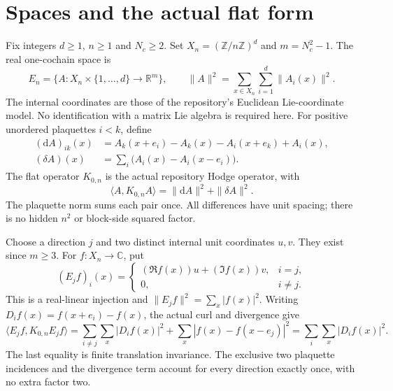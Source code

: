 \documentclass[11pt]{article}
\newcommand{\R}{\mathbb R}
\newcommand{\C}{\mathbb C}
\newcommand{\ip}[2]{\langle #1,#2\rangle}
\begin{document}
\section{Spaces and the actual flat form}
Fix integers $d\geq1$, $n\geq1$ and $N_c\geq2$. Set
$X_n=(\mathbb Z/n\mathbb Z)^d$ and $m=N_c^2-1$. The real one-cochain space is
\[
 E_n=\{A:X_n\times\{1,\ldots,d\}\longrightarrow\R^m\},\qquad
 \|A\|^2=\sum_{x\in X_n}\sum_{i=1}^d\|A_i(x)\|^2.
\]
The internal coordinates are those of the repository's Euclidean Lie-coordinate
model. No identification with a matrix Lie algebra is required here.
For positive unordered plaquettes $i<k$, define
\begin{align*}
 (\mathrm dA)_{ik}(x)&=A_k(x+e_i)-A_k(x)-A_i(x+e_k)+A_i(x),\\
 (\delta A)(x)&=\sum_i\bigl(A_i(x)-A_i(x-e_i)\bigr).
\end{align*}
The flat operator $K_{0,n}$ is the actual repository Hodge operator, with
\begin{equation}\label{eq:hodge}
 \ip{A}{K_{0,n}A}=\|\mathrm dA\|^2+\|\delta A\|^2.
\end{equation}
The plaquette norm sums each pair once. All differences have unit spacing;
there is no hidden $n^2$ or block-side squared factor.

Choose a direction $j$ and two distinct internal unit coordinates $u,v$.
They exist since $m\geq3$. For $f:X_n\to\C$, put
\[
 (E_jf)_i(x)=\begin{cases}(\Re f(x))u+(\Im f(x))v,&i=j,\\0,&i\ne j.\end{cases}
\]
This is a real-linear injection and $\|E_jf\|^2=\sum_x|f(x)|^2$.
Writing $D_i f(x)=f(x+e_i)-f(x)$, the actual curl and divergence give
\begin{equation}\label{eq:stencil}
 \ip{E_jf}{K_{0,n}E_jf}
 =\sum_{i\ne j}\sum_x|D_i f(x)|^2+
   \sum_x|f(x)-f(x-e_j)|^2
 =\sum_i\sum_x|D_i f(x)|^2.
\end{equation}
The last equality is finite translation invariance. The exclusive two
plaquette incidences and the divergence term account for every direction
exactly once, with no extra factor two.
\end{document}
